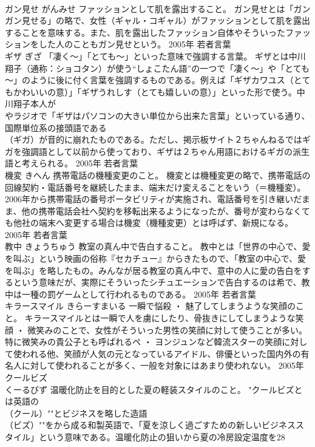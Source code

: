 \documentclass[8pt]{extreport}
\begin{document}
\begin{CJK}{UTF8}{min}
\\	ガン見せ	がんみせ	ファッションとして肌を露出すること。	ガン見せとは「ガンガン見せる」の略で、女性（ギャル・コギャル）がファッションとして肌を露出することを意味する。また、肌を露出したファッション自体やそういったファッションをした人のこともガン見せという。	2005年	若者言葉	
\\	ギザ	ぎざ	「凄く～」「とても～」といった意味で強調する言葉。	ギザとは中川翔子（通称：ショコタン）が使う“しょこたん語”の一つで「凄く～」や「とても～」のように後に付く言葉を強調するものである。例えば「ギザカワユス（とてもかわいいの意）」「ギザうれしす（とても嬉しいの意）」といった形で使う。中川翔子本人が
\\	やラジオで「ギザはパソコンの大きい単位から出来た言葉」といっている通り、国際単位系の接頭語である
\\	（ギガ）が音的に崩れたものである。ただし、掲示板サイト２ちゃんねるではギガを強調語として以前から使っており、ギザは２ちゃん用語におけるギガの派生語と考えられる。	2005年	若者言葉	
\\	機変	きへん	携帯電話の機種変更のこと。	機変とは機種変更の略で、携帯電話の回線契約・電話番号を継続したまま、端末だけ変えることをいう（＝機種変）。2006年から携帯電話の番号ポータビリティが実施され、電話番号を引き継いだまま、他の携帯電話会社へ契約を移転出来るようになったが、番号が変わらなくても他社の端末へ変更する場合は機変（機種変更）とは呼ばず、新規になる。	2005年	若者言葉	
\\	教中	きょうちゅう	教室の真ん中で告白すること。	教中とは「世界の中心で、愛を叫ぶ」という映画の俗称『セカチュー』からきたもので、「教室の中心で、愛を叫ぶ」を略したもの。みんなが居る教室の真ん中で、意中の人に愛の告白をするという意味だが、実際にそういったシチュエーションで告白するのは希で、教中は一種の罰ゲームとして行われるものである。	2005年	若者言葉	
\\	キラースマイル	きらーすまいる	一瞬で悩殺 ・ 魅了してしまうような笑顔のこと。	キラースマイルとは一瞬で人を虜にしたり、骨抜きにしてしまうような笑顔 ・ 微笑みのことで、女性がそういった男性の笑顔に対して使うことが多い。特に微笑みの貴公子とも呼ばれるペ ・ ヨンジュンなど韓流スターの笑顔に対して使われる他、笑顔が人気の元となっているアイドル、俳優といった国内外の有名人に対して使われることが多く、一般を対象にはあまり使われない。	2005年	
\\	クールビズ 
\\	くーるびず	温暖化防止を目的とした夏の軽装スタイルのこと。	"クールビズとは英語の
\\	（クール）""とビジネスを略した造語
\\	（ビズ）""をから成る和製英語で、「夏を涼しく過ごすための新しいビジネススタイル」という意味である。温暖化防止の狙いから夏の冷房設定温度を28

\end{CJK}
\end{document}
